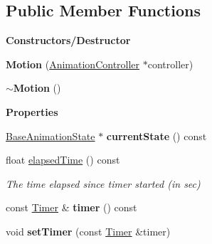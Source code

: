 \subsection*{Public Member Functions}
\begin{Indent}\textbf{ Constructors/\+Destructor}\par
\begin{DoxyCompactItemize}
\item 
\mbox{\label{classrev_1_1_motion_a80934e636e60f14ce1947740431d2fb3}} 
{\bfseries Motion} (\mbox{\hyperlink{classrev_1_1_animation_controller}{Animation\+Controller}} $\ast$controller)
\item 
\mbox{\label{classrev_1_1_motion_a852eb25f10dbe12cce810baf20384808}} 
{\bfseries $\sim$\+Motion} ()
\end{DoxyCompactItemize}
\end{Indent}
\begin{Indent}\textbf{ Properties}\par
\begin{DoxyCompactItemize}
\item 
\mbox{\label{classrev_1_1_motion_aa10976a85c3a9f96abe1f0f18780cdad}} 
\mbox{\hyperlink{classrev_1_1_base_animation_state}{Base\+Animation\+State}} $\ast$ {\bfseries current\+State} () const
\item 
\mbox{\label{classrev_1_1_motion_a8424b615747ffeb4d9ff0176215c5640}} 
float \mbox{\hyperlink{classrev_1_1_motion_a8424b615747ffeb4d9ff0176215c5640}{elapsed\+Time}} () const
\begin{DoxyCompactList}\small\item\em The time elapsed since timer started (in sec) \end{DoxyCompactList}\item 
\mbox{\label{classrev_1_1_motion_a1791892b7566cf600976a60f1ea5462c}} 
const \mbox{\hyperlink{classrev_1_1_timer}{Timer}} \& {\bfseries timer} () const
\item 
\mbox{\label{classrev_1_1_motion_a6aa77808cbe0821d36fe000823dd3204}} 
void {\bfseries set\+Timer} (const \mbox{\hyperlink{classrev_1_1_timer}{Timer}} \&timer)
\end{DoxyCompactItemize}
\end{Indent}
